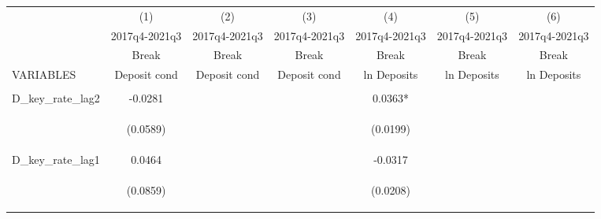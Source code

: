 



\begin{tabular}{lcccccc} \hline
 & (1) & (2) & (3) & (4) & (5) & (6) \\
 & 2017q4-2021q3 & 2017q4-2021q3 & 2017q4-2021q3 & 2017q4-2021q3 & 2017q4-2021q3 & 2017q4-2021q3 \\
 & Break & Break & Break & Break & Break & Break \\
VARIABLES & Deposit cond & Deposit cond & Deposit cond & ln Deposits & ln Deposits & ln Deposits \\ \hline
\vspace{4pt} & \begin{footnotesize}\end{footnotesize} & \begin{footnotesize}\end{footnotesize} & \begin{footnotesize}\end{footnotesize} & \begin{footnotesize}\end{footnotesize} & \begin{footnotesize}\end{footnotesize} & \begin{footnotesize}\end{footnotesize} \\
D\_key\_rate\_lag2 & -0.0281 &  &  & 0.0363* &  &  \\
\vspace{4pt} & \begin{footnotesize}(0.0589)\end{footnotesize} & \begin{footnotesize}\end{footnotesize} & \begin{footnotesize}\end{footnotesize} & \begin{footnotesize}(0.0199)\end{footnotesize} & \begin{footnotesize}\end{footnotesize} & \begin{footnotesize}\end{footnotesize} \\
D\_key\_rate\_lag1 & 0.0464 &  &  & -0.0317 &  &  \\
\vspace{4pt} & \begin{footnotesize}(0.0859)\end{footnotesize} & \begin{footnotesize}\end{footnotesize} & \begin{footnotesize}\end{footnotesize} & \begin{footnotesize}(0.0208)\end{footnotesize} & \begin{footnotesize}\end{footnotesize} & \begin{footnotesize}\end{footnotesize} \\

\end{tabular}
